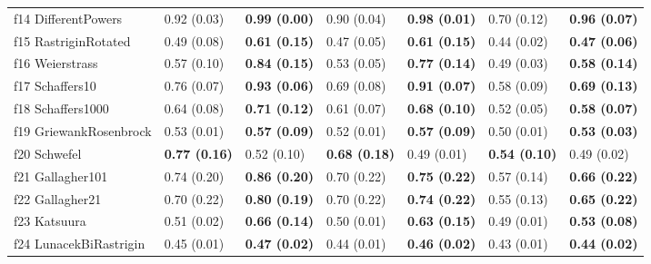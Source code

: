 \begin{table}
\begin{tabular}{lllllll}
f14 DifferentPowers & 0.92 (0.03) & \textbf{0.99 (0.00)} & 0.90 (0.04) & \textbf{0.98 (0.01)} & 0.70 (0.12) & \textbf{0.96 (0.07)} \\
f15 RastriginRotated & 0.49 (0.08) & \textbf{0.61 (0.15)} & 0.47 (0.05) & \textbf{0.61 (0.15)} & 0.44 (0.02) & \textbf{0.47 (0.06)} \\
f16 Weierstrass & 0.57 (0.10) & \textbf{0.84 (0.15)} & 0.53 (0.05) & \textbf{0.77 (0.14)} & 0.49 (0.03) & \textbf{0.58 (0.14)} \\
f17 Schaffers10 & 0.76 (0.07) & \textbf{0.93 (0.06)} & 0.69 (0.08) & \textbf{0.91 (0.07)} & 0.58 (0.09) & \textbf{0.69 (0.13)} \\
f18 Schaffers1000 & 0.64 (0.08) & \textbf{0.71 (0.12)} & 0.61 (0.07) & \textbf{0.68 (0.10)} & 0.52 (0.05) & \textbf{0.58 (0.07)} \\
f19 GriewankRosenbrock & 0.53 (0.01) & \textbf{0.57 (0.09)} & 0.52 (0.01) & \textbf{0.57 (0.09)} & 0.50 (0.01) & \textbf{0.53 (0.03)} \\
f20 Schwefel & \textbf{0.77 (0.16)} & 0.52 (0.10) & \textbf{0.68 (0.18)} & 0.49 (0.01) & \textbf{0.54 (0.10)} & 0.49 (0.02) \\
f21 Gallagher101 & 0.74 (0.20) & \textbf{0.86 (0.20)} & 0.70 (0.22) & \textbf{0.75 (0.22)} & 0.57 (0.14) & \textbf{0.66 (0.22)} \\
f22 Gallagher21 & 0.70 (0.22) & \textbf{0.80 (0.19)} & 0.70 (0.22) & \textbf{0.74 (0.22)} & 0.55 (0.13) & \textbf{0.65 (0.22)} \\
f23 Katsuura & 0.51 (0.02) & \textbf{0.66 (0.14)} & 0.50 (0.01) & \textbf{0.63 (0.15)} & 0.49 (0.01) & \textbf{0.53 (0.08)} \\
f24 LunacekBiRastrigin & 0.45 (0.01) & \textbf{0.47 (0.02)} & 0.44 (0.01) & \textbf{0.46 (0.02)} & 0.43 (0.01) & \textbf{0.44 (0.02)} \\
\bottomrule
\end{tabular}
\end{table}

